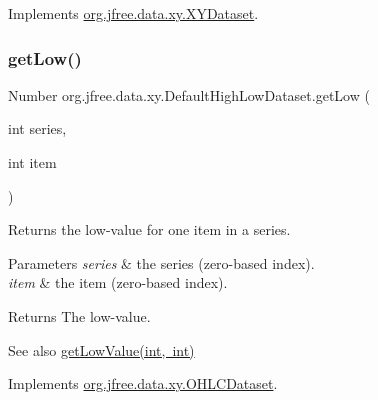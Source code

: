 Implements \mbox{\hyperlink{interfaceorg_1_1jfree_1_1data_1_1xy_1_1_x_y_dataset_ae81f9de91dfcae45028fc8a486a119da}{org.\+jfree.\+data.\+xy.\+X\+Y\+Dataset}}.

\mbox{\label{classorg_1_1jfree_1_1data_1_1xy_1_1_default_high_low_dataset_a01dec545835846178a9731df03bbc435}} 
\subsubsection{\texorpdfstring{get\+Low()}{getLow()}}
{\footnotesize\ttfamily Number org.\+jfree.\+data.\+xy.\+Default\+High\+Low\+Dataset.\+get\+Low (\begin{DoxyParamCaption}\item[{int}]{series,  }\item[{int}]{item }\end{DoxyParamCaption})}

Returns the low-\/value for one item in a series.


\begin{DoxyParams}{Parameters}
{\em series} & the series (zero-\/based index). \\
\hline
{\em item} & the item (zero-\/based index).\\
\hline
\end{DoxyParams}
\begin{DoxyReturn}{Returns}
The low-\/value.
\end{DoxyReturn}
\begin{DoxySeeAlso}{See also}
\mbox{\hyperlink{classorg_1_1jfree_1_1data_1_1xy_1_1_default_high_low_dataset_a4cecc7ed3e3050d94f84389b3d82b9cb}{get\+Low\+Value(int, int)}} 
\end{DoxySeeAlso}


Implements \mbox{\hyperlink{interfaceorg_1_1jfree_1_1data_1_1xy_1_1_o_h_l_c_dataset_a87d7730829e66f23a2601c3519cf828a}{org.\+jfree.\+data.\+xy.\+O\+H\+L\+C\+Dataset}}.

\mbox{\label{classorg_1_1jfree_1_1data_1_1xy_1_1_default_high_low_dataset_a4cecc7ed3e3050d94f84389b3d82b9cb}} 
